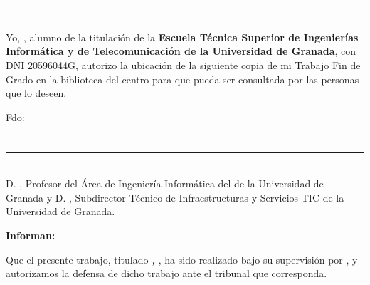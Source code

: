 \chapter*{}
\thispagestyle{empty}

\noindent\rule[-1ex]{\textwidth}{2pt}\\[4.5ex]

Yo, \textbf{\myName}, alumno de la titulación \myDegree de la \textbf{Escuela Técnica Superior de Ingenierías Informática y de Telecomunicación de la Universidad de Granada}, con DNI 20596044G, autorizo la
ubicación de la siguiente copia de mi Trabajo Fin de Grado en la biblioteca del centro para que pueda ser
consultada por las personas que lo deseen.

\vspace{6cm}

\noindent Fdo: \myName

\vspace{2cm}

\begin{flushright}
\myDate
\end{flushright}


\chapter*{}
\thispagestyle{empty}

\noindent\rule[-1ex]{\textwidth}{2pt}\\[4.5ex]

D. \textbf{\myProf}, Profesor del Área de Ingeniería Informática del \myDepartment de la Universidad de Granada y D. \textbf{\myProfsec}, Subdirector Técnico de Infraestructuras y Servicios TIC de la Universidad de Granada.

\vspace{0.5cm}



\textbf{Informan:}

\vspace{0.5cm}

Que el presente trabajo, titulado \textit{\textbf{\myTitle, \mySubTitle}},
ha sido realizado bajo su supervisión por \textbf{\myName}, y autorizamos la defensa de dicho trabajo ante el tribunal
que corresponda.

\vspace{0.5cm}

